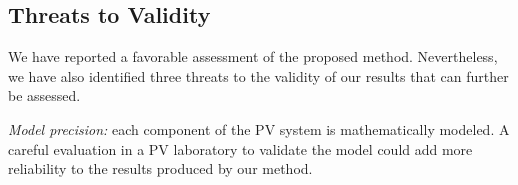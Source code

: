 \documentclass[review]{elsarticle}
\begin{document}
%
%
%
\subsection{Threats to Validity}
We have reported a favorable assessment of the proposed method. %
Nevertheless, we have also identified three threats to the validity of our results that can further be assessed.

\textit{Model precision:} each component of the PV system is mathematically modeled. %
A careful evaluation in a PV laboratory to validate the model could add more reliability to the results produced by our method.
\end{document}
